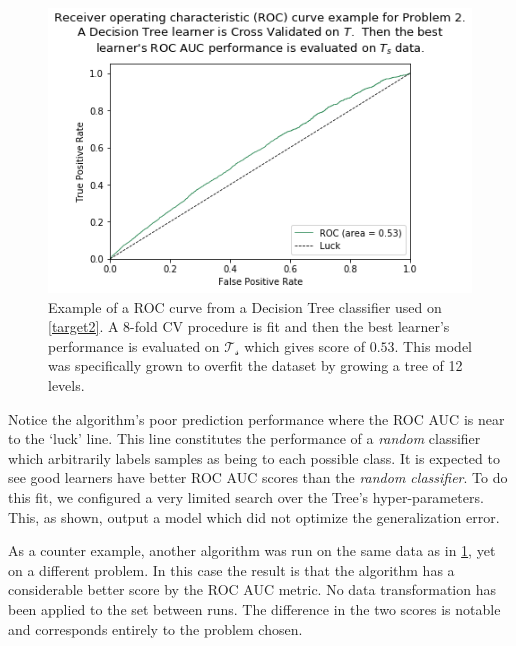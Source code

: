 \begin{figure}[h!]
\begin{center}
\includegraphics[width=1.2\columnwidth]{figures/figure-lowROCAUC/figure-lowROCAUC_original}
\caption{Example of a ROC curve from a Decision Tree classifier used on \cref{target2}. A 8-fold CV procedure is fit and then the best learner's performance is evaluated on $\mathcal{T_s}$ which gives score of $0.53$. This model was specifically grown to overfit the dataset by growing a tree of 12 levels.}
\label{fg:lowROCAUC}
\end{center}
\end{figure}

Notice the algorithm's poor prediction performance where the ROC AUC is near to the `luck' line.
This line constitutes the performance of a \textit{random} classifier which arbitrarily labels samples as being to each possible class.
It is expected to see good learners have better ROC AUC scores than the \textit{random classifier}.
To do this fit, we configured a very limited search over the Tree's hyper-parameters.
This, as shown, output a model which did not optimize the generalization error. 


As a counter example, another algorithm was run on the same data as in \cref{fg:lowROCAUC}, yet on a different problem.
In this case the result is that the algorithm has a considerable better score by the ROC AUC metric.
No data transformation has been applied to the set between runs.
The difference in the two scores is notable and corresponds entirely to the problem chosen.

